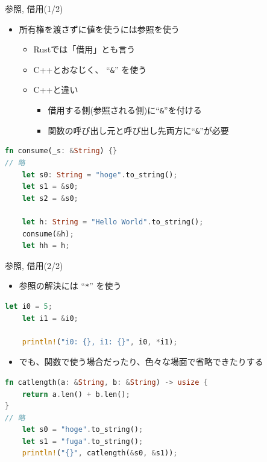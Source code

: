 \documentclass[cjk,dvipdfmx,10pt,compress,fragile%
hyperref={bookmarks=true,bookmarksnumbered=true,bookmarksopen=false,%
colorlinks=false,%
pdftitle={第 134 回 関西 Debian 勉強会},%
pdfauthor={小林},%
pdfsubject={資料},%
}]{beamer}
\begin{document}
\begin{frame}[t,fragile]{参照, 借用(1/2)}
 \begin{itemize}
  \item 所有権を渡さずに値を使うには参照を使う
	\begin{itemize}
	 \item Rustでは「借用」とも言う
	 \item C++とおなじく、 ``\texttt{\&}'' を使う
	 \item C++と違い
	       \begin{itemize}
		\item 借用する側(参照される側)に``\texttt{\&}''を付ける
		\item 関数の呼び出し元と呼び出し先両方に``\texttt{\&}''が必要
	       \end{itemize}
	\end{itemize}
 \end{itemize}
 \begin{lstlisting}[language=Rust,style=boxed,style=colouredRust,basicstyle=\small\tt,lineskip=-2pt]
fn consume(_s: &String) {}
// 略
    let s0: String = "hoge".to_string();
    let s1 = &s0;
    let s2 = &s0;

    let h: String = "Hello World".to_string();
    consume(&h);
    let hh = h;\end{lstlisting}
\end{frame}

\begin{frame}[t,fragile]{参照, 借用(2/2)}
\begin{itemize}
 \item 参照の解決には ``\texttt{*}'' を使う
\end{itemize}
\begin{lstlisting}[language=Rust,style=boxed,style=colouredRust,basicstyle=\small\tt,lineskip=-2pt]
    let i0 = 5;
    let i1 = &i0;

    println!("i0: {}, i1: {}", i0, *i1);\end{lstlisting}
\begin{itemize}
 \item でも、関数で使う場合だったり、色々な場面で省略できたりする
\end{itemize}
\begin{lstlisting}[language=Rust,style=boxed,style=colouredRust,basicstyle=\small\tt,lineskip=-2pt]
fn catlength(a: &String, b: &String) -> usize {
    return a.len() + b.len();
}
// 略
    let s0 = "hoge".to_string();
    let s1 = "fuga".to_string();
    println!("{}", catlength(&s0, &s1));\end{lstlisting}
\end{frame}
\end{document}
